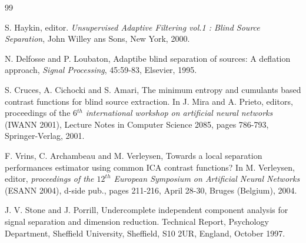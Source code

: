 \documentclass{esannV2}
\begin{document}

\begin{footnotesize}

\begin{thebibliography}{99}

 S. Haykin, editor. \emph{Unsupervised Adaptive Filtering vol.1 : Blind Source Separation}, John Willey ans Sons, New York, 2000.

N. Delfosse and P. Loubaton, Adaptibe blind separation of sources: A deflation
approach, \emph{Signal Processing}, 45:59-83, Elsevier, 1995.

 S. Cruces, A. Cichocki and S. Amari, The minimum entropy and cumulants based contrast functions for blind source extraction. In J. Mira and A. Prieto, editors, proceedings of the 6$^{th}$ \emph{international workshop on artificial neural networks} ({IWANN} 2001), Lecture Notes in Computer Science 2085, pages 786-793,
Springer-Verlag, 2001.

 F. Vrins, C. Archambeau and M. Verleysen, Towards a local separation performances estimator using common ICA contrast functions? In M. Verleysen, editor, \emph{proceedings of the $12^{th}$
European Symposium on Artificial Neural Networks} ({ESANN} 2004),
d-side pub., pages 211-216, April 28-30, Bruges (Belgium), 2004.

 J. V. Stone and J. Porrill, Undercomplete independent component analysis for signal separation and dimension
reduction. Technical Report, Psychology Department, Sheffield
University, Sheffield, S10 2UR, England, October 1997.
\end{thebibliography}


%
%

\end{footnotesize}

\end{document}
